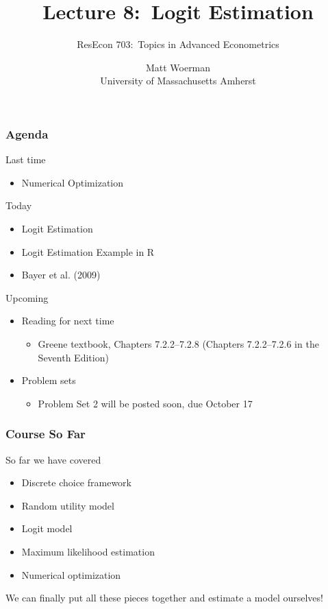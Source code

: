 \documentclass{beamer}
\title[Lecture 8:\ Logit Estimation]{Lecture 8:\ Logit Estimation}
\author[ResEcon 703:\ Advanced Econometrics]{ResEcon 703:\ Topics in Advanced Econometrics}
\date{Matt Woerman\\University of Massachusetts Amherst}
\begin{document}
{ 
\begin{frame}[noframenumbering]
    \titlepage
\end{frame}
}

\begin{frame}\frametitle{Agenda}
    Last time
    \begin{itemize}
        \item Numerical Optimization
    \end{itemize}
    \vspace{2ex}
    Today
    \begin{itemize}
    	\item Logit Estimation
    	\item Logit Estimation Example in R
        \item Bayer et al. (2009)
    \end{itemize}
    \vspace{2ex}
    Upcoming
    \begin{itemize}
        \item Reading for next time
        \begin{itemize}
            \item Greene textbook, Chapters 7.2.2--7.2.8 (Chapters 7.2.2--7.2.6 in the Seventh Edition)
        \end{itemize}
        \item Problem sets
        \begin{itemize}
            \item Problem Set 2 will be posted soon, due October 17
        \end{itemize}
    \end{itemize}
\end{frame}

\begin{frame}\frametitle{Course So Far}
    So far we have covered
    \begin{itemize}
    	\item Discrete choice framework
    	\item Random utility model
    	\item Logit model
    	\item Maximum likelihood estimation
    	\item Numerical optimization
    \end{itemize}
    \vspace{3ex}
    We can finally put all these pieces together and estimate a model ourselves!
\end{frame}
\end{document}
